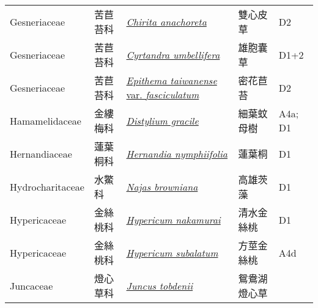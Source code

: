 {\begin{longtable}{L{2.5cm}L{2cm}L{5cm}L{2.5cm}L{3cm}}
    Gesneriaceae & 苦苣苔科 & \href{http://www.theplantlist.org/tpl1.1/search?q=Chirita+anachoreta}{\textit{Chirita anachoreta} } & 雙心皮草 & D2    \\
    Gesneriaceae & 苦苣苔科 & \href{http://www.theplantlist.org/tpl1.1/search?q=Cyrtandra+umbellifera}{\textit{Cyrtandra umbellifera} } & 雄胞囊草 & D1+2    \\
    Gesneriaceae & 苦苣苔科 & \href{http://www.theplantlist.org/tpl1.1/search?q=Epithema+taiwanense+var.+fasciculatum}{\textit{Epithema taiwanense} var. \textit{fasciculatum} } & 密花苣苔 & D2    \\
    Hamamelidaceae & 金縷梅科 & \href{http://www.theplantlist.org/tpl1.1/search?q=Distylium+gracile}{\textit{Distylium gracile} } & 細葉蚊母樹 & A4a; D1    \\
    Hernandiaceae & 蓮葉桐科 & \href{http://www.theplantlist.org/tpl1.1/search?q=Hernandia+nymphiifolia}{\textit{Hernandia nymphiifolia} } & 蓮葉桐 & D1    \\
    Hydrocharitaceae & 水鱉科 & \href{http://www.theplantlist.org/tpl1.1/search?q=Najas+browniana}{\textit{Najas browniana} } & 高雄茨藻 & D1    \\
    Hypericaceae & 金絲桃科 & \href{http://www.theplantlist.org/tpl1.1/search?q=Hypericum+nakamurai}{\textit{Hypericum nakamurai} } & 清水金絲桃 & D1    \\
    Hypericaceae & 金絲桃科 & \href{http://www.theplantlist.org/tpl1.1/search?q=Hypericum+subalatum}{\textit{Hypericum subalatum} } & 方莖金絲桃 & A4d    \\
    Juncaceae & 燈心草科 & \href{http://www.theplantlist.org/tpl1.1/search?q=Juncus+tobdenii}{\textit{Juncus tobdenii} } & 鴛鴦湖燈心草 &     \\

\end{longtable}}

